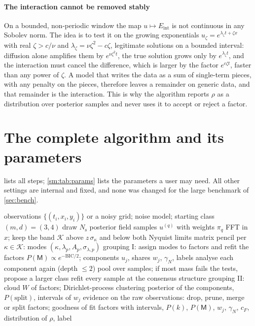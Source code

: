\documentclass[11pt]{article}
\theoremstyle{plain}
\theoremstyle{definition}
\theoremstyle{remark}
\newcommand{\Eint}{E_{\mathrm{int}}}        %
\newcommand{\cF}{c_{F}}                     %
\newcommand{\gN}{\gamma_{N}}                %
\newcommand{\sigbin}{\sigma_{\kappa}}       %
\newcommand{\Nsamp}{N_{\mathrm s}}          %
\newcommand{\cloud}{W}                      %
\newcommand{\Mfit}{\mathsf{M}}              %
\begin{document}
\paragraph{The interaction cannot be removed stably} On a bounded, non-periodic window the map $u\mapsto\Eint$ is not
continuous in any Sobolev norm. The idea is to test it on the growing exponentials $u_\zeta=e^{\lambda_\zeta t+\zeta x}$ with
real $\zeta>c/\nu$ and $\lambda_\zeta=\nu\zeta^2-c\zeta$, legitimate solutions on a bounded interval: diffusion alone amplifies
them by $e^{\nu\zeta^2t}$, the true solution grows only by $e^{\lambda_\zeta t}$, and the interaction must cancel the difference,
which is larger by the factor $e^{c\zeta t}$, faster than any power of $\zeta$. A model that writes the data as a sum of
single-term pieces, with any penalty on the pieces, therefore leaves a remainder on generic data, and that remainder is
the interaction. This is why the algorithm reports $\rho$ as a distribution over posterior samples and never uses it to
accept or reject a factor.

\section{The complete algorithm and its parameters}\label{sm:algo}
 lists all steps; \cref{sm:tab:params} lists the parameters a user may need. All other settings are
internal and fixed, and none was changed for the large benchmark of \cref{sec:bench}.

\begin{algorithm}[htbp]
\caption{Learning a constant-coefficient PDE by grouping its modes}\label{sm:alg:full}
\begin{algorithmic}[1]
\Require observations $\{(t_i,x_i,y_i)\}$ or a noisy grid; noise model; starting class $(m,d)=(3,4)$
\State draw $\Nsamp$ posterior field samples $u^{(q)}$ with weights $\pi_q$ 
\Repeat {}
    \State FFT in $x$; keep the band $\mathcal K$ above $z\,\sigbin$ and below both Nyquist limits
    \State matrix pencil per $\kappa\in\mathcal K$: modes $(\kappa,\lambda_p,A_p,\sigma_{\lambda,p})$
    \For{each structure $\Mfit\in C(m,d)$}
      \State grouping I: assign modes to factors and refit the factors 
    \EndFor
    \State $P(\Mfit)\propto e^{-\mathrm{BIC}/2}$; components $u_j$, shares $w_j$, $\gN$, labels
    \State analyse each component again (depth $\le2$)
  \EndFor
  \State pool over samples; if most mass fails the tests, propose a larger class
\State refit every sample at the consensus structure
\State grouping II: cloud $\cloud$ of factors; Dirichlet-process clustering 
\State posterior of the components, $P(\text{split})$, intervals of $w_j$
\State evidence on the raw observations: drop, prune, merge or split factors; goodness of fit 
\State \Return factors with intervals, $P(k)$, $P(\Mfit)$, $w_j$, $\gN$, $\cF$, distribution of $\rho$, label
\end{algorithmic}
\end{algorithm}
\end{document}
